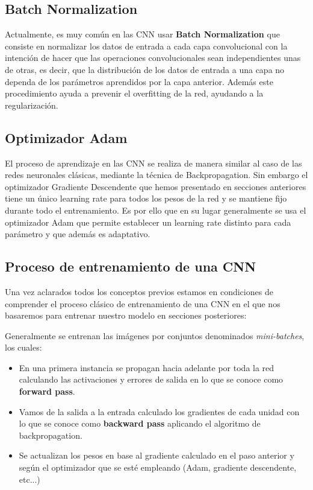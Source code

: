         \subsection{Batch Normalization}
            \noindent Actualmente, es muy común en las CNN usar \textbf{Batch Normalization} que consiste en normalizar los datos de entrada a cada capa convolucional con la intención de hacer que las operaciones convolucionales sean independientes unas de otras, es decir, que la distribución de los datos de entrada a una capa no dependa de los parámetros aprendidos por la capa anterior. Además este procedimiento ayuda a prevenir el overfitting de la red, ayudando a la regularización.

        \subsection{Optimizador Adam}
            El proceso de aprendizaje en las CNN se realiza de manera similar al caso de las redes neuronales clásicas, mediante la técnica de Backpropagation. Sin embargo el optimizador Gradiente Descendente que hemos presentado en secciones anteriores tiene un único learning rate para todos los pesos de la red y se mantiene fijo durante todo el entrenamiento. Es por ello que en su lugar generalmente se usa el optimizador Adam que permite establecer un learning rate distinto para cada parámetro y que además es adaptativo.

        \subsection{Proceso de entrenamiento de una CNN}

            \noindent Una vez aclarados todos los conceptos previos estamos en condiciones de comprender el proceso clásico de entrenamiento de una CNN en el que nos basaremos para entrenar nuestro modelo en secciones posteriores: 

            \medskip

            \noindent Generalmente se entrenan las imágenes por conjuntos denominados \textit{mini-batches}, los cuales: 

            \begin{itemize}
                \item En una primera instancia se propagan hacia adelante por toda la red calculando las activaciones y errores de salida en lo que se conoce como \textbf{forward pass}.
                \item Vamos de la salida a la entrada calculado los gradientes de cada unidad con lo que se conoce como \textbf{backward pass} aplicando el algoritmo de backpropagation.
                \item Se actualizan los pesos en base al gradiente calculado en el paso anterior y según el optimizador que se esté empleando (Adam, gradiente descendente, etc...)
            \end{itemize}

